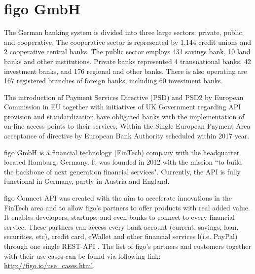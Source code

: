 \chapter{figo GmbH}
\label{chap:figo}
The German banking system is divided into three large sectors: private, public, and cooperative. The cooperative sector is represented by 1,144 credit unions and 2 cooperative central banks. The public sector employs 431 savings bank, 10 land banks and other institutions. Private banks represented 4 transnational banks, 42 investment banks, and 176 regional and other banks. There is also operating are 167 registered branches of foreign banks, including 60 investment banks\cite{listOfBanks}.   

The introduction of Payment Services Directive (PSD) and PSD2 by European Commission in EU together with initiatives of UK Government regarding API provision and standardization have obligated banks with the implementation of on-line access points to their services\cite{LarsAPI}\cite{TimAPI}\cite{DaveAPI}. Within the Single European Payment Area acceptance of directive by European Bank Authority scheduled within 2017 year\cite{PSD2}.

figo GmbH is a financial technology (FinTech) company with the headquarter located Hamburg, Germany. It was founded in 2012  with the mission “to build the backbone of next generation financial services"\cite{figoFAQVision}.  Currently, the API is fully functional in Germany, partly in Austria and England\cite{figoAngel}\cite{figoCB}.

figo Connect API was created with the aim to accelerate innovations in the FinTech area and to allow figo's partners to offer products with real added value\cite{figoFAQWhat}. It enables developers, startups, and even banks to connect to every financial service. These partners can access every bank account (current, savings, loan, securities, etc), credit card, eWallet and other financial services l(i.e. PayPal) through one single REST-API \cite{figoFAQWhat}\cite{figoFAQVision}\cite{figoFAQPartners}. The list of figo's partners and customers  together with their use cases can be found via following link: \url{http://figo.io/use\_cases.html}.


